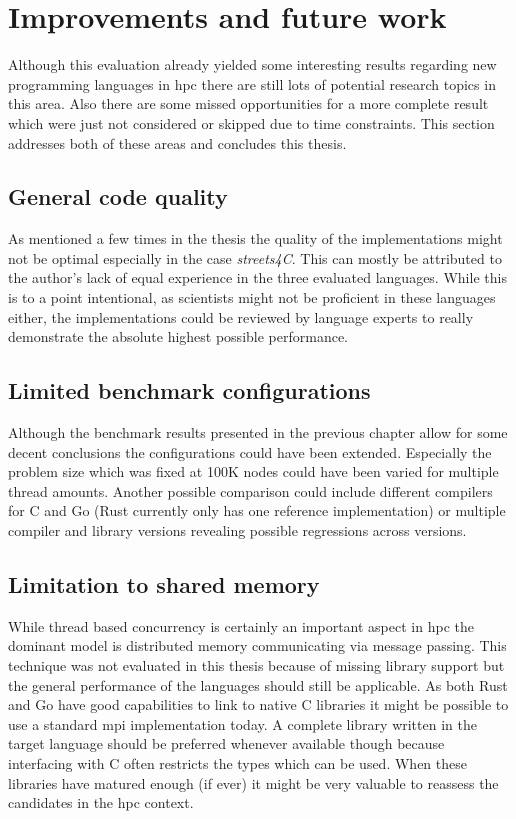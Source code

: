 \section{Improvements and future work}
\label{sec:Conclusion::Improvements}

Although this evaluation already yielded some interesting results regarding new programming languages in \gls{hpc} there are still lots of potential research topics in this area. Also there are some missed opportunities for a more complete result which were just not considered or skipped due to time constraints. This section addresses both of these areas and concludes this thesis.

\subsection*{General code quality}
\label{subsec:Conclusion::Improvements::CodeQuality}

As mentioned a few times in the thesis the quality of the implementations might not be optimal especially in the case \textit{streets4C}. This can mostly be attributed to the author's lack of equal experience in the three evaluated languages. While this is to a point intentional, as scientists might not be proficient in these languages either, the implementations could be reviewed by language experts to really demonstrate the absolute highest possible performance.

\subsection*{Limited benchmark configurations}
\label{subsec:Conclusion::Improvements::Configuration}

Although the benchmark results presented in the previous chapter allow for some decent conclusions the configurations could have been extended. Especially the problem size which was fixed at 100K nodes could have been varied for multiple thread amounts. Another possible comparison could include different compilers for C and Go (Rust currently only has one reference implementation) or multiple compiler and library versions revealing possible regressions across versions.

\subsection*{Limitation to shared memory}
\label{subsec:Conclusion::Improvements::SharedMemory}

While thread based concurrency is certainly an important aspect in \gls{hpc} the dominant model is distributed memory communicating via message passing. This technique was not evaluated in this thesis because of missing library support but the general performance of the languages should still be applicable. As both Rust and Go have good capabilities to link to native C libraries it might be possible to use a standard \gls{mpi} implementation today. A complete library written in the target language should be preferred whenever available though because interfacing with C often restricts the types which can be used. When these libraries have matured enough (if ever) it might be very valuable to reassess the candidates in the \gls{hpc} context.
